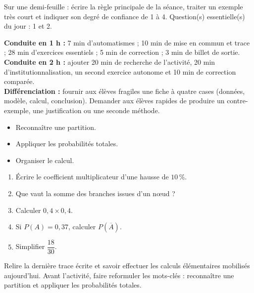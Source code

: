\begin{sortie}Sur une demi-feuille : écrire la règle principale de la séance, traiter un exemple très court et indiquer son degré de confiance de 1 à 4. Question(s) essentielle(s) du jour : 1 et 2.\end{sortie}

\ifprof
\begin{methode}
\textbf{Conduite en 1 h :} 7 min d'automatismes ; 10 min de mise en commun et trace ; 28 min d'exercices essentiels ; 5 min de correction ; 3 min de billet de sortie.\\
\textbf{Conduite en 2 h :} ajouter 20 min de recherche de l'activité, 20 min d'institutionnalisation, un second exercice autonome et 10 min de correction comparée.\\
\textbf{Différenciation :} fournir aux élèves fragiles une fiche à quatre cases (données, modèle, calcul, conclusion). Demander aux élèves rapides de produire un contre-exemple, une justification ou une seconde méthode.
\end{methode}
\fi
{}
    \begin{objectifs}\begin{itemize}\item Reconnaître une partition.\item Appliquer les probabilités totales.\item Organiser le calcul.\end{itemize}\end{objectifs}
    \begin{automatismes}\begin{enumerate}\item Écrire le coefficient multiplicateur d'une hausse de $10\,\%$. \item Que vaut la somme des branches issues d'un nœud ? \item Calculer $0{,}4\times0{,}4$. \item Si $P(A)=0{,}37$, calculer $P(\overline A)$. \item Simplifier $\dfrac{18}{30}$. \end{enumerate}\end{automatismes}
    \begin{prerequis}Relire la dernière trace écrite et savoir effectuer les calculs élémentaires mobilisés aujourd'hui. Avant l'activité, faire reformuler les mots-clés : reconnaître une partition et appliquer les probabilités totales.\end{prerequis}

